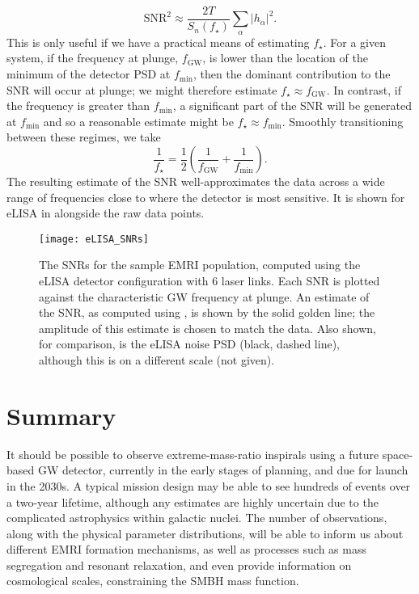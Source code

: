 \begin{equation}
\label{eq:EMRI-SNR-estimate}
\mathrm{SNR}^2 \approx \frac{2T}{S_n(f_\star)} \sum_{\alpha}|h_\alpha|^2.
\end{equation}
This is only useful if we have a practical means of estimating $f_\star$. For a given system, if the frequency at plunge, $f_\mathrm{GW}$, is lower than the location of the minimum of the detector PSD at $f_\mathrm{min}$, then the dominant contribution to the SNR will occur at plunge; we might therefore estimate $f_\star \approx f_\mathrm{GW}$. In contrast, if the frequency is greater than $f_\mathrm{min}$, a significant part of the SNR will be generated at $f_\mathrm{min}$ and so a reasonable estimate might be $f_\star \approx f_\mathrm{min}$. Smoothly transitioning between these regimes, we take
\begin{equation}
\frac1{f_\star} = \frac1{2} \left( \frac1{f_\mathrm{GW}} + \frac1{f_\mathrm{min}} \right).
\end{equation}
The resulting estimate of the SNR well-approximates the data across a wide range of frequencies close to where the detector is most sensitive. It is shown for eLISA in  alongside the raw data points.

\begin{figure}[htbp]
\centering
\texttt{[image: eLISA\_SNRs]}
\caption{\label{fig:EMRI-eLISA-SNRs}The SNRs for the sample EMRI population, computed using the eLISA detector configuration with 6 laser links. Each SNR is plotted against the characteristic GW frequency at plunge. An estimate of the SNR, as computed using , is shown by the solid golden line; the amplitude of this estimate is chosen to match the data. Also shown, for comparison, is the eLISA noise PSD (black, dashed line), although this is on a different scale (not given).}
\end{figure}

\section{Summary}
It should be possible to observe extreme-mass-ratio inspirals using a future space-based GW detector, currently in the early stages of planning, and due for launch in the 2030s. A typical mission design may be able to see hundreds of events over a two-year lifetime, although any estimates are highly uncertain due to the complicated astrophysics within galactic nuclei. The number of observations, along with the physical parameter distributions, will be able to inform us about different EMRI formation mechanisms, as well as processes such as mass segregation and resonant relaxation, and even provide information on cosmological scales, constraining the SMBH mass function.

